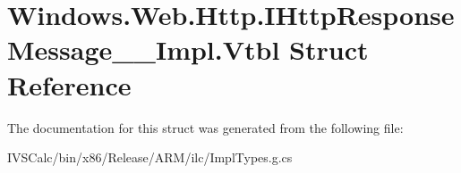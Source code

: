 \hypertarget{struct_windows_1_1_web_1_1_http_1_1_i_http_response_message_____impl_1_1_vtbl}{}\section{Windows.\+Web.\+Http.\+I\+Http\+Response\+Message\+\_\+\+\_\+\+Impl.\+Vtbl Struct Reference}
\label{struct_windows_1_1_web_1_1_http_1_1_i_http_response_message_____impl_1_1_vtbl}


The documentation for this struct was generated from the following file\+:\begin{DoxyCompactItemize}
\item 
I\+V\+S\+Calc/bin/x86/\+Release/\+A\+R\+M/ilc/Impl\+Types.\+g.\+cs\end{DoxyCompactItemize}
